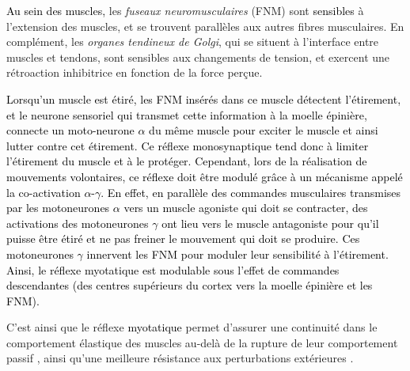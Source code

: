\textcolor{black}{Au sein des muscles,} les \emph{fuseaux neuromusculaires} (FNM) sont \textcolor{black}{sensibles} à l'extension des muscles, et se trouvent parallèles aux autres fibres musculaires. %
En complément, les \emph{organes tendineux de Golgi}, qui se situent à l'interface entre muscles et tendons, sont sensibles aux changements de tension, et exercent une rétroaction inhibitrice en fonction de la force perçue.

\textcolor{black}{Lorsqu'un muscle est étiré, les FNM insérés dans ce muscle détectent l'étirement, et le neurone sensoriel qui transmet cette information à la moelle épinière, connecte un moto-neurone $\alpha$ du même muscle pour exciter le muscle et ainsi lutter contre cet étirement. Ce réflexe monosynaptique tend donc à limiter l’étirement du muscle et à le protéger. Cependant, lors de la réalisation de mouvements volontaires, ce réflexe doit être modulé grâce à un mécanisme appelé la co-activation $\alpha$-$\gamma$. En effet, en parallèle des commandes musculaires transmises par les motoneurones $\alpha$ vers un muscle agoniste qui doit se contracter, des activations des motoneurones $\gamma$ ont lieu vers le muscle antagoniste pour qu'il puisse être étiré et ne pas freiner le mouvement qui doit se produire. Ces motoneurones $\gamma$ innervent les FNM pour moduler leur sensibilité à l'étirement. Ainsi, le réflexe myotatique est modulable sous l’effet de commandes descendantes (des centres supérieurs du cortex vers la moelle épinière et les FNM).}

C'est ainsi que le réflexe \textcolor{black}{myotatique} permet d'assurer une continuité dans le comportement élastique des muscles au-delà de la rupture de leur comportement passif \parencite{nichols_improvement_1976, houk_regulation_1979}, ainsi qu'une meilleure résistance aux perturbations extérieures \parencite{mcmahon_muscles_1984,shadmehr_computational_2004}. %

